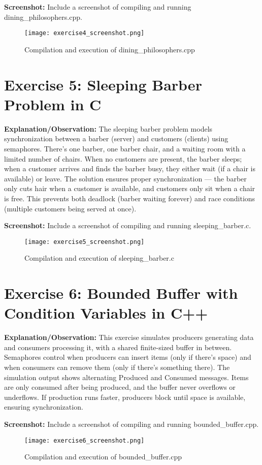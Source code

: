 \documentclass{article}
\begin{document}
\textbf{Screenshot:} Include a screenshot of compiling and running dining\_philosophers.cpp.
\begin{figure}[h]
\centering
\texttt{[image: exercise4\_screenshot.png]}
\caption{Compilation and execution of dining\_philosophers.cpp}
\end{figure}

\section{Exercise 5: Sleeping Barber Problem in C}


\textbf{Explanation/Observation:}  
The sleeping barber problem models synchronization between a barber (server) and customers (clients) using semaphores. There’s one barber, one barber chair, and a waiting room with a limited number of chairs. When no customers are present, the barber sleeps; when a customer arrives and finds the barber busy, they either wait (if a chair is available) or leave. The solution ensures proper synchronization — the barber only cuts hair when a customer is available, and customers only sit when a chair is free. This prevents both deadlock (barber waiting forever) and race conditions (multiple customers being served at once).

\textbf{Screenshot:} Include a screenshot of compiling and running sleeping\_barber.c.
\begin{figure}[h]
\centering
\texttt{[image: exercise5\_screenshot.png]}
\caption{Compilation and execution of sleeping\_barber.c}
\end{figure}

\section{Exercise 6: Bounded Buffer with Condition Variables in C++}


\textbf{Explanation/Observation:}  
This exercise simulates producers generating data and consumers processing it, with a shared finite-sized buffer in between. Semaphores control when producers can insert items (only if there’s space) and when consumers can remove them (only if there’s something there). The simulation output shows alternating Produced and Consumed messages. Items are only consumed after being produced, and the buffer never overflows or underflows. If production runs faster, producers block until space is available, ensuring synchronization.

\textbf{Screenshot:} Include a screenshot of compiling and running bounded\_buffer.cpp.
\begin{figure}[h]
\centering
\texttt{[image: exercise6\_screenshot.png]}
\caption{Compilation and execution of bounded\_buffer.cpp}
\end{figure}
\end{document}
